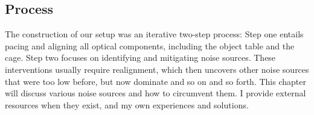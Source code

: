 \subsection*{Process}
	The construction of our setup was an iterative two-step process: Step one entails pacing and aligning all optical components, including the object table and the cage. Step two focuses on identifying and mitigating noise sources. These interventions usually require realignment, which then uncovers other noise sources that were too low before, but now dominate and so on and so forth. This chapter will discuss various noise sources and how to circumvent them. I provide external resources when they exist, and my own experiences and solutions. %
	
